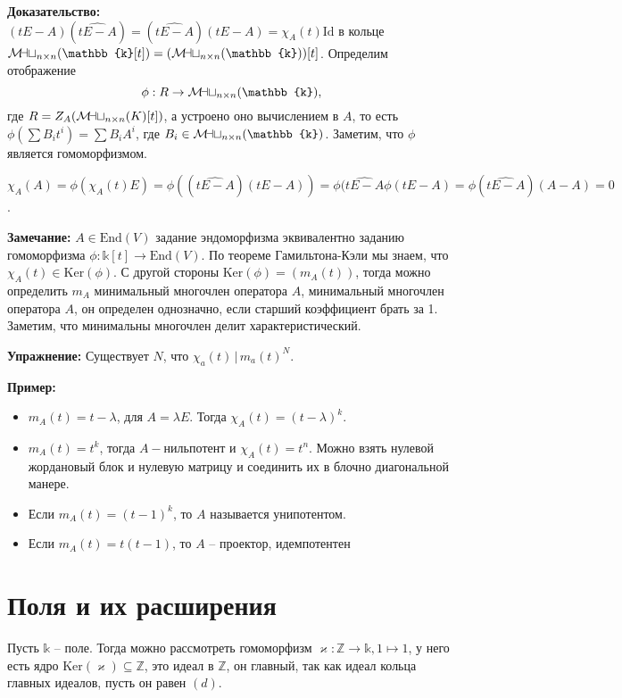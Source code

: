 \documentclass[a4paper, 12pt]{book}
\newcommand{\mymat}{\mathcal{M\mkern-3mu a\mkern-0.3mu t}}
\begin{document}
 \textbf{Доказательство:}\\$(tE-A)(\widehat{tE-A})=(\widehat{tE-A})(tE-A)=\chi_A(t)
 \text{Id}$ в кольце $\mymat_{n\times n}(\mathbb{k}[t])=(\mymat_{n\times n}
 (\mathbb{k}))[t]$. Определим отображение \[\phi: R\rightarrow\mymat_{n\times n}
 (\mathbb{k}),\] где $R=Z_A(\mymat_{n\times n}(K)[t])$, а устроено оно
 вычислением в $A$, то есть $\phi(\sum B_it^i)=\sum B_iA^i$, где $B_i\in
 \mymat_{n\times n}(\mathbb{k})$. Заметим, что $\phi$ является гомоморфизмом.

 $\chi_A(A)=\phi(\chi_A(t)E)=\phi((\widehat{tE-A})(tE-A))=\phi(\widehat{tE-A}
 \phi(tE-A)=\phi(\widehat{tE-A})(A-A)=0$.

 \textbf{Замечание:} $A\in\text{End}(V)$ задание эндоморфизма эквивалентно заданию
 гомоморфизма $\phi:\mathbb{k}[t]\rightarrow\text{End}(V)$. По теореме
 Гамильтона-Кэли мы знаем, что $\chi_A(t)\in\text{Ker}(\phi)$. С другой стороны
 $\text{Ker}(\phi)=(m_A(t))$, тогда можно определить $m_A$ минимальный многочлен
 оператора $A$, минимальный многочлен оператора $A$, он определен однозначно,
 если старший коэффициент брать за 1. Заметим, что минимальны многочлен делит
 характеристический.

 \textbf{Упражнение:} Существует $N$, что $\chi_a(t)\,|\,m_a(t)^N$.

 \textbf{Пример:}
 \begin{itemize}
     \item $m_A(t)=t-\lambda$, для $A=\lambda E$. Тогда $\chi_A(t)=(t-
         \lambda)^k$.

     \item $m_A(t)=t^k$, тогда $A-нильпотент$ и $\chi_A(t)=t^n$. Можно взять
         нулевой жордановый блок и нулевую матрицу и соединить их в блочно
         диагональной манере.

     \item Если $m_A(t)=(t-1)^k$, то $A$ называется унипотентом.
         
     \item Если $m_A(t)=t(t-1)$, то $A$ – проектор, идемпотентен
 \end{itemize}
 \chapter{Поля и их расширения}
 Пусть $\mathbb{k}$ – поле. Тогда можно рассмотреть гомоморфизм $\varkappa:
 \mathbb{Z}\rightarrow\mathbb{k}, 1\mapsto 1$, у него есть ядро $\text{Ker}
 (\varkappa)\subseteq\mathbb{Z}$, это идеал в $\mathbb{Z}$, он главный, так как
 идеал кольца главных идеалов, пусть он равен $(d)$.
 
\end{document}
